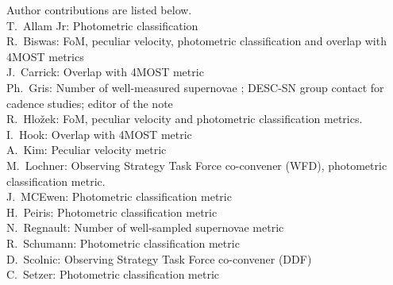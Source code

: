 Author contributions are listed below. \\
T.~Allam Jr: Photometric classification \\
R.~Biswas: FoM, peculiar velocity, photometric classification and overlap with 4MOST metrics \\
J.~Carrick: Overlap with 4MOST metric \\
Ph.~Gris: Number of well-measured supernovae ; DESC-SN group contact for cadence studies; editor of the note \\
R.~Hlo\v{z}ek: FoM, peculiar velocity and photometric classification metrics. \\
I.~Hook: Overlap with 4MOST metric \\
A.~Kim: Peculiar velocity metric \\
M.~Lochner: Observing Strategy Task Force co-convener (WFD), photometric classification metric. \\
J.~MCEwen: Photometric classification metric \\
H.~Peiris: Photometric classification metric \\
N.~Regnault: Number of well-sampled supernovae metric \\
R.~Schumann: Photometric classification metric \\
D.~Scolnic: Observing Strategy Task Force co-convener (DDF) \\
C.~Setzer: Photometric classification metric \\
